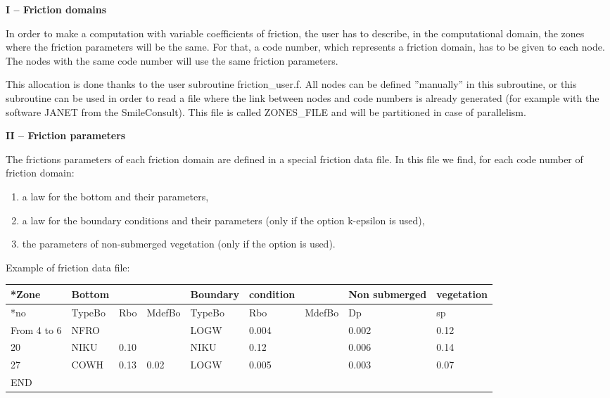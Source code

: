  \textbf{I -- Friction domains}

 In order to make a computation with variable coefficients of friction, the user has to describe, in the computational domain, the zones where the friction parameters will be the same. For that, a code number, which represents a friction domain, has to be given to each node. The nodes with the same code number will use the same friction parameters.

 This allocation is done thanks to the user subroutine friction\_user.f. All nodes can be defined ''manually'' in this subroutine, or this subroutine can be used in order to read a file where the link between nodes and code numbers is already generated (for example with the software JANET from the SmileConsult). This file is called ZONES\_FILE and will be partitioned in case of parallelism.

 \textbf{II -- Friction parameters}

 The frictions parameters of each friction domain are defined in a special friction data file. In this file we find, for each code number of friction domain:

\begin{enumerate}
\item  a law for the bottom and their parameters,

\item  a law for the boundary conditions and their parameters (only if the option k-epsilon is used),

\item  the parameters of non-submerged vegetation (only if the option is used).
\end{enumerate}

  Example of friction data file:



\begin{tabular}{|p{0.3in}|p{0.3in}|p{0.3in}|p{0.4in}|p{0.4in}|p{0.5in}|p{0.5in}|p{0.7in}|p{0.5in}|} \hline
*Zone & Bottom &  &  & Boundary & condition &  & Non submerged & vegetation \\ \hline
*no & TypeBo & Rbo & MdefBo & TypeBo & Rbo & MdefBo & Dp & sp \\ \hline
From 4 to 6 & NFRO &  &  & LOGW & 0.004 &  & 0.002 & 0.12 \\ \hline
20 & NIKU & 0.10 &  & NIKU & 0.12 &  & 0.006 & 0.14 \\ \hline
27 & COWH & 0.13 & 0.02 & LOGW & 0.005 &  & 0.003 & 0.07 \\ \hline
END &  &  &  &  &  &  &  &  \\ \hline
\end{tabular}



